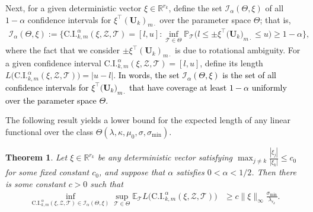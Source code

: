 \documentclass[10pt]{article}
\newcommand{\0}{{\mathbf{0}}}
\newcommand{\1}{{\mathbf{1}}}
\newcommand{\U}{{\mathbf{U}}}
\renewcommand{\t}{^{\top}}
\newcommand{\uhat}{\mathbf{\hat{U}}}
\newtheorem{theorem}{Theorem}
\newcommand{\p}{\mathbb{P}}
\renewcommand{\hat}{\widehat}
\renewcommand{\hat}{\widehat}
\begin{document}
Next, for a given deterministic vector $\xi \in \mathbb{R}^{r_k}$, define the set $\mathcal{I}_{\alpha}(\Theta,\xi)$ of all $1-\alpha$ confidence intervals for $\xi\t (\mathbf{U}_k)_{m\cdot}$ over the parameter space $\Theta$; that is,
 \begin{align*}
     \mathcal{I}_{\alpha}(\Theta,\xi) := \bigg\{ \mathrm{C.I.}_{k,m}^{\alpha}(\xi,\mathcal{Z},\mathcal{T}) = [l, u]: \inf_{\mathcal{T} \in \Theta} \p_{\mathcal{T}}\big( l \leq \pm \xi\t\big( \mathbf{U}_k\big)_{m\cdot} \leq u \big)\geq 1 - \alpha \bigg\},
 \end{align*}
 where the fact that we consider $\pm \xi\t (\U_k)_{m\cdot}$ is due to rotational ambiguity.  For a given confidence interval $\mathrm{C.I.}_{k,m}^{\alpha}(\xi,\mathcal{Z},\mathcal{T}) = [l,u]$, define its length $L\big( \mathrm{C.I.}_{k,m}^{\alpha}(\xi,\mathcal{Z},\mathcal{T}) \big) =|u - l|$.  \textcolor{black}{In words, the set $\mathcal{I}_{\alpha}(\Theta,\xi)$ is the set of all confidence intervals for $\xi\t\big( \mathbf{U}_k\big)_{m\cdot}$ that have coverage at least $1-\alpha$ uniformly over the parameter space $\Theta$.}
 
The following result yields a lower bound for the expected length of any linear functional over the class $\Theta(\lambda,\kappa,\mu_0,\sigma,\sigma_{\min})$.  

\begin{theorem} \label{thm:efficiency_order}
     Let $\xi \in \mathbb{R}^{r_k}$ be any deterministic vector satisfying $\max_{j\neq k} \frac{|\xi_j|}{|\xi_k|} \leq c_0$ for some fixed constant $c_0$, and suppose that  $\alpha$ satisfies $ 0 < \alpha < 1/2$. Then there is some constant $c > 0$ such that
     \begin{align*}
         \inf_{\mathrm{C.I.}_{k,m}^{\alpha}(\xi,\mathcal{Z},\mathcal{T}) \in \mathcal{I}_{\alpha}(\Theta,\xi)} \sup_{\mathcal{T} \in \Theta} \mathbb{E}_{\mathcal{T}} L\big( \mathrm{C.I.}_{k,m}^{\alpha}(\xi,\mathcal{Z},\mathcal{T}) \big) &\geq c \|\xi\|_{\infty} \frac{\sigma_{\min}}{\lambda_{r_k}}.
     \end{align*}
 \end{theorem}
\end{document}

